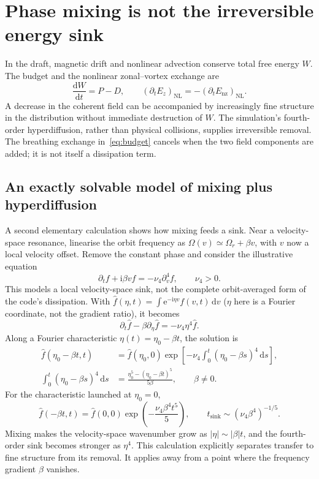 \documentclass[10pt,a4paper]{article}
\newcommand{\dd}{\mathrm{d}}
\newcommand{\ii}{\mathrm{i}}
\newcommand{\E}{\mathrm{e}}
\newcommand{\nz}{\mathrm{nz}}
\begin{document}
\newpage
\section{Phase mixing is not the irreversible energy sink}
In the draft, magnetic drift and nonlinear advection conserve total free energy $W$. The budget and the nonlinear zonal--vortex exchange are~\cite{draft}
\begin{equation}
 \frac{\dd W}{\dd t}=P-D,\qquad
 (\partial_tE_z)_{\mathrm{NL}}=-(\partial_tE_\nz)_{\mathrm{NL}}.
 \label{eq:budget}
\end{equation}
A decrease in the coherent field can be accompanied by increasingly fine structure in the distribution without immediate destruction of $W$. The simulation's fourth-order hyperdiffusion, rather than physical collisions, supplies irreversible removal. The breathing exchange in~\eqref{eq:budget} cancels when the two field components are added; it is not itself a dissipation term.

\subsection{An exactly solvable model of mixing plus hyperdiffusion}
A second elementary calculation shows how mixing feeds a sink. Near a velocity-space resonance, linearise the orbit frequency as $\Omega(v)\simeq\Omega_r+\beta v$, with $v$ now a local velocity offset. Remove the constant phase and consider the illustrative equation
\begin{equation}
 \partial_tf+\ii\beta vf=-\nu_4\partial_v^4f,\qquad \nu_4>0.
 \label{eq:sink-model}
\end{equation}
This models a local velocity-space sink, not the complete orbit-averaged form of the code's dissipation. With $\widehat f(\eta,t)=\int\E^{-\ii\eta v}f(v,t)\,\dd v$ ($\eta$ here is a Fourier coordinate, not the gradient ratio), it becomes
\begin{equation}
 \partial_t\widehat f-\beta\partial_\eta\widehat f
 =-\nu_4\eta^4\widehat f.
 \label{eq:fourier-sink}
\end{equation}
Along a Fourier characteristic $\eta(t)=\eta_0-\beta t$, the solution is
\begin{align}
 \widehat f(\eta_0-\beta t,t)
 &=\widehat f(\eta_0,0)\exp\!\left[-\nu_4\int_0^t(\eta_0-\beta s)^4\,\dd s\right],\label{eq:characteristic}\\
 \int_0^t(\eta_0-\beta s)^4\,\dd s
 &=\frac{\eta_0^5-(\eta_0-\beta t)^5}{5\beta},\qquad\beta\ne0.
 \label{eq:sink-integral}
\end{align}
For the characteristic launched at $\eta_0=0$,
\begin{equation}
 \boxed{\widehat f(-\beta t,t)=\widehat f(0,0)
 \exp\!\left(-\frac{\nu_4\beta^4t^5}{5}\right),\qquad
 t_{\mathrm{sink}}\sim(\nu_4\beta^4)^{-1/5}.}
 \label{eq:sink-time}
\end{equation}
Mixing makes the velocity-space wavenumber grow as $|\eta|\sim|\beta|t$, and the fourth-order sink becomes stronger as $\eta^4$. This calculation explicitly separates transfer to fine structure from its removal. It applies away from a point where the frequency gradient $\beta$ vanishes.
\end{document}
